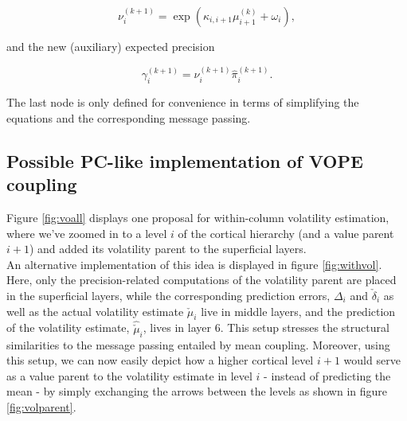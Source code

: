 \begin{equation}
  \nu_i^{(k+1)} = \exp(\kappa_{i,i+1} \mu_{i+1}^{(k)} + \omega_i),
\end{equation}

and the new (auxiliary) expected precision

\begin{equation}
  \gamma_i^{(k+1)} = \nu_i^{(k+1)} \hat{\pi}_i^{(k+1)}.
\end{equation}

The last node is only defined for convenience in terms of simplifying the equations and the corresponding message passing.


\subsection{Possible PC-like implementation of VOPE coupling}


Figure \ref{fig:voall} displays one proposal for within-column volatility estimation, where we've zoomed in to a level $i$ of the cortical hierarchy (and a value parent $i+1$) and added its volatility parent to the superficial layers. \\

An alternative implementation of this idea is displayed in figure \ref{fig:withvol}. Here, only the precision-related computations of the volatility parent are placed in the superficial layers, while the corresponding prediction errors, $\Delta_i$ and $\check{\delta}_i$ as well as the actual volatility estimate $\check{\mu}_i$ live in middle layers, and the prediction of the volatility estimate, $\hat{\check{\mu}}_i$, lives in layer 6. This setup stresses the structural similarities to the message passing entailed by mean coupling. Moreover, using this setup, we can now easily depict how a higher cortical level $i+1$ would serve as a value parent to the volatility estimate in level $i$ - instead of predicting the mean - by simply exchanging the arrows between the levels as shown in figure \ref{fig:volparent}. 


